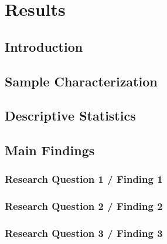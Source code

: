 \chapter{Results}
\label{chapter:results}


\section{Introduction}

\section{Sample Characterization}

\section{Descriptive Statistics}

\section{Main Findings}

\subsection{Research Question 1 / Finding 1}

\subsection{Research Question 2 / Finding 2}

\subsection{Research Question 3 / Finding 3}

